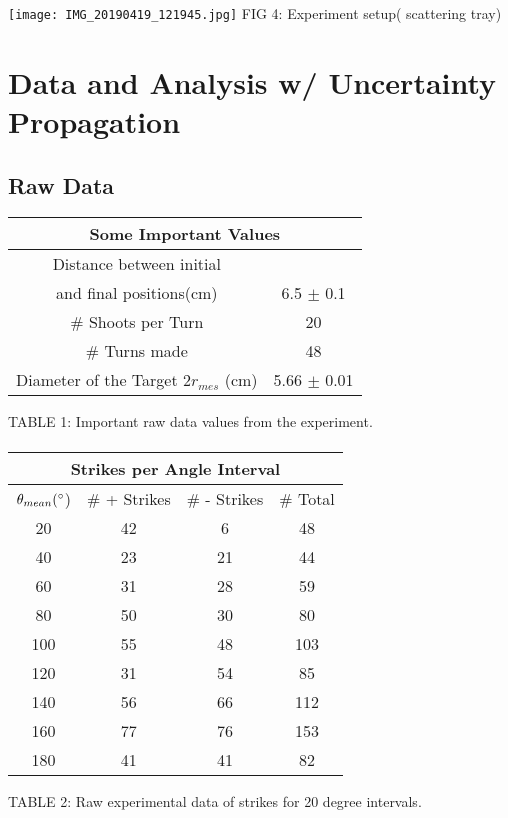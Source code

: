 \documentclass[a4paper]{article}
\begin{document}
\begin{multicols}{2}
\begin{center}

\texttt{[image: IMG\_20190419\_121945.jpg]} 
FIG 4: Experiment setup( scattering tray)

\end{center}

\section{Data and Analysis w/ Uncertainty Propagation}

\subsection{Raw Data}

\begin{center}

\begin{tabular}{c|c} 
\multicolumn{2}{c}{Some Important Values}  \\
\hline 
Distance between initial\\ and final positions(cm) & 6.5 $\pm$ 0.1 \\
\hline 
\# Shoots per Turn & 20 \\
\hline
\# Turns made & 48 \\ 
\hline 
Diameter of the Target $2r_{mes}$ (cm) & 5.66 $\pm$ 0.01 \\ 
\hline 
\end{tabular} 

TABLE 1: Important raw data values from the experiment. 

\paragraph{}

\begin{tabular}{cccc} 
\multicolumn{4}{c}{Strikes per Angle Interval} \\
\hline
$\theta_{mean}(\degree$)& \# + Strikes& \# - Strikes& \# Total\\
\hline
\hline 
20 & 42 & 6 & 48 \\ 
\hline 
40 & 23 & 21 & 44 \\ 
\hline 
60 & 31 & 28 & 59 \\ 
\hline 
80 & 50 & 30 & 80 \\ 
\hline 
100 & 55 & 48 & 103 \\ 
\hline 
120 & 31 & 54 & 85 \\ 
\hline 
140 & 56 & 66 & 112 \\ 
\hline 
160 & 77 & 76 & 153 \\ 
\hline 
180 & 41 & 41 & 82 \\ 
\hline 
\end{tabular} 
TABLE 2: Raw experimental data of strikes for 20 degree intervals.


\end{center}
\end{multicols}
\end{document}

